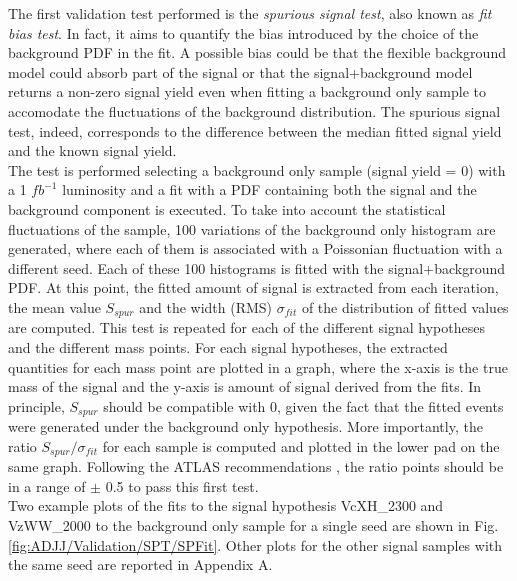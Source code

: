 The first validation test performed is the \textit{spurious signal test}, also known as \textit{fit bias test}.
In fact, it aims to quantify the bias introduced by the choice of the background PDF in the fit.
A possible bias could be that the flexible background model could absorb part of the signal or that the signal+background model returns a non-zero signal yield even when fitting a background only sample to accomodate the fluctuations of the background distribution.
The spurious signal test, indeed, corresponds to the difference between the median fitted signal yield and the known signal yield.\\ 
The test is performed selecting a background only sample (signal yield = 0) with a 1 $fb^{-1}$ luminosity and a fit with a PDF containing both the signal and the background component is executed.
To take into account the statistical fluctuations of the sample, 100 variations of the background only histogram are generated, where each of them is associated with a Poissonian fluctuation with a different seed.
Each of these 100 histograms is fitted with the signal+background PDF.
At this point, the fitted amount of signal is extracted from each iteration, the mean value $S_{spur}$ and the width (RMS) $\sigma_{fit}$ of the distribution of fitted values are computed.
This test is repeated for each of the different signal hypotheses and the different mass points.
For each signal hypotheses, the extracted quantities for each mass point are plotted in a graph, where the x-axis is the true mass of the signal and the y-axis is amount of signal derived from the fits.
In principle, $S_{spur}$ should be compatible with 0, given the fact that the fitted events were generated under the background only hypothesis.
More importantly, the ratio $S_{spur}/\sigma_{fit}$ for each sample is computed and plotted in the lower pad on the same graph.
Following the ATLAS recommendations \cite{ATLAS_smoothBKG}, the ratio points should be in a range of $\pm$ 0.5 to pass this first test.\\
Two example plots of the fits to the signal hypothesis VcXH\_2300 and VzWW\_2000 to the background only sample for a single seed are shown in Fig. \ref{fig:ADJJ/Validation/SPT/SPFit}.
Other plots for the other signal samples with the same seed are reported in Appendix A.


